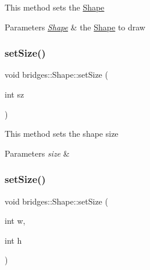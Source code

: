 This method sets the \mbox{\hyperlink{classbridges_1_1_shape}{Shape}}


\begin{DoxyParams}{Parameters}
{\em \mbox{\hyperlink{classbridges_1_1_shape}{Shape}}} & the \mbox{\hyperlink{classbridges_1_1_shape}{Shape}} to draw \\
\hline
\end{DoxyParams}
\mbox{\label{classbridges_1_1_shape_a0fa2dae24c7ea2654b54e03adcdefa67}} 
\subsubsection{\texorpdfstring{set\+Size()}{setSize()}\hspace{0.1cm}{\footnotesize\ttfamily [1/2]}}
{\footnotesize\ttfamily void bridges\+::\+Shape\+::set\+Size (\begin{DoxyParamCaption}\item[{int}]{sz }\end{DoxyParamCaption})\hspace{0.3cm}{\ttfamily [inline]}}

This method sets the shape size


\begin{DoxyParams}{Parameters}
{\em size} & \\
\hline
\end{DoxyParams}
\mbox{\label{classbridges_1_1_shape_ae90702ee6a0cfd866eec71c5f6ec0559}} 
\subsubsection{\texorpdfstring{set\+Size()}{setSize()}\hspace{0.1cm}{\footnotesize\ttfamily [2/2]}}
{\footnotesize\ttfamily void bridges\+::\+Shape\+::set\+Size (\begin{DoxyParamCaption}\item[{int}]{w,  }\item[{int}]{h }\end{DoxyParamCaption})\hspace{0.3cm}{\ttfamily [inline]}}

